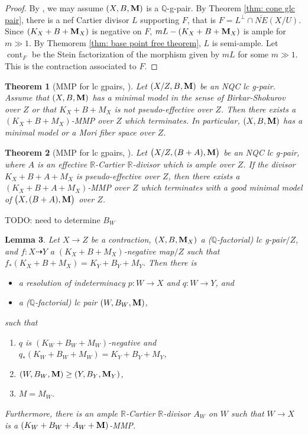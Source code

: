 \documentclass[11pt]{amsart}
\numberwithin{equation}{section}
\newcommand{\Mm}{{\bf{M}}}
\newcommand{\Qq}{\mathbb{Q}}
\newcommand{\cont}{\operatorname{cont}}
\newtheorem{thm}{Theorem}[section]
\newtheorem{lem}[thm]{Lemma}
\theoremstyle{definition}
\theoremstyle{definition}
\theoremstyle{definition}
\begin{document}
\begin{proof}
  By \cite[Theorem 2.28]{HL21}, we may assume $(X,B,\Mm)$ is a $\mathbb{Q}$-g-pair. By Theorem \ref{thm: cone glc pair}, there is a nef Cartier divisor $L$ supporting $F$, that is $F= L^{\bot} \cap \overline{NE}(X/U)$. Since $(K_{X}+B+\Mm_{X})$ is negative on $F$,   $mL-(K_{X}+B+\Mm_{X})$ is ample for $m\gg 1$. By Themorem \ref{thm: base point free theorem}, $L$ is semi-ample. Let $\cont_F$ be the Stein factorization of the morphism given by $mL$ for some $m \gg 1$. This is the contraction associated to $F$. 
\end{proof}

\begin{thm}[MMP for lc gpairs, {\cite[Proposition 4.1]{TX23}}]\label{thm: gen pair mmp mfs}
		Let $ (X/Z,B,\Mm) $ be an NQC lc g-pair. Assume that $ (X,B,\Mm) $ has a minimal model in the sense of Birkar-Shokurov over $ Z $ or that $ K_X+B+M_{X} $ is not pseudo-effective over $ Z $.  Then there exists a $ (K_X + B + M_{X}) $-MMP over $Z$ which terminates. In particular, $ (X,B,\Mm) $ has a minimal model or a Mori fiber space over $ Z $.
\end{thm}

\begin{thm}[MMP for lc gpairs, {\cite[Theorem 4.4]{TX23}}]\label{thm: gen pair mmp}
		Let $ \big( X/Z,(B+A),\Mm \big) $ be an NQC lc g-pair, where $ A $ is an effective $ \mathbb{R} $-Cartier $\mathbb{R}$-divisor which is ample over $ Z $. If the divisor $K_X+B+A+M_{X}$ is pseudo-effective over $Z$, then there exists a $(K_X+B+A+M_{X})$-MMP over $Z$ which terminates with a good minimal model of $ \big( X,(B+A),\Mm \big) $ over $ Z $.
\end{thm}


TODO: need to determine $B_{W}$ 
\begin{lem}\label{lem: higher model and mmp}
Let $X\rightarrow Z$ be a contraction, $(X,B,\Mm_X)$ a ($\Qq$-factorial) lc g-pair$/Z$, and $f: X\dashrightarrow Y$ a $(K_X+B+M_X)$-negative map$/Z$ such that $f_*(K_X+B+M_X)=K_Y+B_Y+M_Y$. Then there is 
\begin{itemize}
    \item a resolution of indeterminacy $p: W\rightarrow X$ and $q: W\rightarrow Y$, and
    \item a ($\Qq$-factorial) lc pair $(W,B_W,\Mm)$,
\end{itemize}
such that
\begin{enumerate}
    \item $q$ is $(K_W+B_W+M_W)$-negative and $q_*(K_W+B_W+M_W)=K_Y+B_Y+M_Y$,
    \item $(W,B_W,\Mm)\geq (Y,B_Y,\Mm_Y)$,
    \item $M=M_W$.
\end{enumerate} 
Furthermore, there is an ample $\mathbb{R}$-Cartier $\mathbb{R}$-divisor $A_{W}$ on $W$ such that $W\to X$ is a $(K_{W}+B_{W}+A_{W}+\Mm)$-MMP.
\end{lem}
\end{document}
